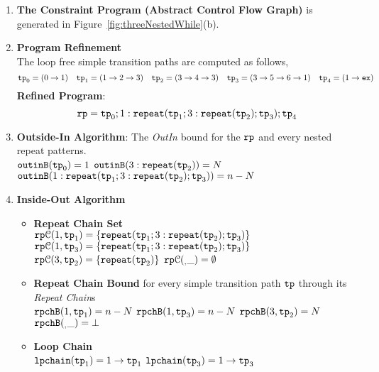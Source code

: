 \begin{enumerate}
  \item  \textbf{The Constraint Program (Abstract Control Flow Graph)} is generated in Figure~\ref{fig:threeNestedWhile}(b).

  \item \textbf{Program Refinement}
  \\
  The loop free simple transition paths are computed as follows,
  \[
          \mathtt{tp}_0 = (0 \to 1)
          \quad
          \mathtt{tp}_1 = (1 \to 2 \to 3)
          \quad           
          \mathtt{tp}_2 = (3 \to 4 \to 3)
          \quad
          \mathtt{tp}_3 = (3 \to 5 \to 6 \to 1)
          \quad
          \mathtt{tp}_4 = (1 \to \mathtt{ex})
      \]
  \textbf{Refined Program}:
  \[
  \mathtt{rp} = \mathtt{tp}_0 ; 1: \mathtt{repeat}(\mathtt{tp}_1; 3: \mathtt{repeat}(\mathtt{tp}_2); \mathtt{tp}_3); \mathtt{tp}_4
  \]
  \item \textbf{Outside-In Algorithm}: The \emph{OutIn} bound for the $\mathtt{rp}$ and every nested repeat patterns.
  \\
$\mathtt{outinB}(\mathtt{tp}_0) = 1$
\quad
$\mathtt{outinB}(3: \mathtt{repeat}(\mathtt{tp}_2)) = N $
\\
$\mathtt{outinB}(1: \mathtt{repeat}(\mathtt{tp}_1; 3: \mathtt{repeat}(\mathtt{tp}_2); \mathtt{tp}_3)) = n - N $
\item \textbf{Inside-Out Algorithm}
\begin{itemize}
  \item \textbf{Repeat Chain Set}
  \\
  $\mathtt{rp}\mathcal{C}(1, \mathtt{tp}_1) = \{\mathtt{repeat}(\mathtt{tp}_1; 3: \mathtt{repeat}(\mathtt{tp}_2); \mathtt{tp}_3)\}$
  \\
  $\mathtt{rp}\mathcal{C}(1, \mathtt{tp}_3) = \{\mathtt{repeat}(\mathtt{tp}_1; 3: \mathtt{repeat}(\mathtt{tp}_2); \mathtt{tp}_3)\}$
  \\
  $\mathtt{rp}\mathcal{C}(3, \mathtt{tp}_2) = \{\mathtt{repeat}(\mathtt{tp}_2)\}$ \quad
  $\mathtt{rp}\mathcal{C}(_, \_) = \emptyset$ 
  \item \textbf{Repeat Chain Bound} for every simple transition path $\mathtt{tp}$ through its \emph{Repeat Chain}s
  \\
  $\mathtt{rpchB}(1, \mathtt{tp}_1) = n - N$ \quad
  $\mathtt{rpchB}(1, \mathtt{tp}_3) = n - N$ \quad
  $\mathtt{rpchB}(3, \mathtt{tp}_2) = N$ \quad
  $\mathtt{rpchB}(_, \_) = \bot $ 
  \item \textbf{Loop Chain}
  \\
  $\mathtt{lpchain}(\mathtt{tp}_1) = 1\to \mathtt{tp}_1$ \quad
   \quad
  $\mathtt{lpchain}(\mathtt{tp}_3) = 1 \to \mathtt{tp}_3$ \\

\end{itemize}
\end{enumerate}
